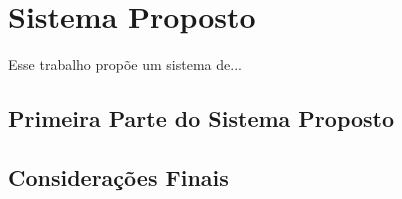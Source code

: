 \chapter{Sistema Proposto}\label{cap:proposta}

Esse trabalho propõe um sistema de... 


\section{Primeira Parte do Sistema Proposto}

\lipsum[67]

\section{Considerações Finais}

\lipsum[68]
